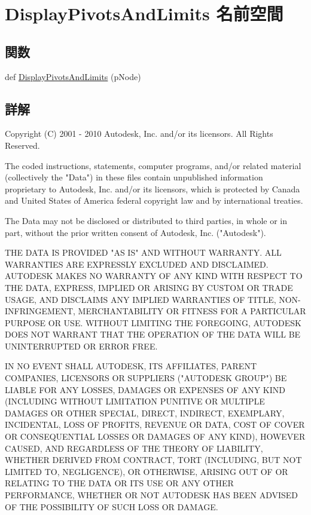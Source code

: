 \hypertarget{namespace_display_pivots_and_limits}{}\section{Display\+Pivots\+And\+Limits 名前空間}
\label{namespace_display_pivots_and_limits}
\subsection*{関数}
\begin{DoxyCompactItemize}
\item 
def \hyperlink{namespace_display_pivots_and_limits_ae897a9edb3a2e347540c9ab058c697c8}{Display\+Pivots\+And\+Limits} (p\+Node)
\end{DoxyCompactItemize}


\subsection{詳解}
\begin{DoxyVerb} Copyright (C) 2001 - 2010 Autodesk, Inc. and/or its licensors.
 All Rights Reserved.

 The coded instructions, statements, computer programs, and/or related material 
 (collectively the "Data") in these files contain unpublished information 
 proprietary to Autodesk, Inc. and/or its licensors, which is protected by 
 Canada and United States of America federal copyright law and by international 
 treaties. 
 
 The Data may not be disclosed or distributed to third parties, in whole or in
 part, without the prior written consent of Autodesk, Inc. ("Autodesk").

 THE DATA IS PROVIDED "AS IS" AND WITHOUT WARRANTY.
 ALL WARRANTIES ARE EXPRESSLY EXCLUDED AND DISCLAIMED. AUTODESK MAKES NO
 WARRANTY OF ANY KIND WITH RESPECT TO THE DATA, EXPRESS, IMPLIED OR ARISING
 BY CUSTOM OR TRADE USAGE, AND DISCLAIMS ANY IMPLIED WARRANTIES OF TITLE, 
 NON-INFRINGEMENT, MERCHANTABILITY OR FITNESS FOR A PARTICULAR PURPOSE OR USE. 
 WITHOUT LIMITING THE FOREGOING, AUTODESK DOES NOT WARRANT THAT THE OPERATION
 OF THE DATA WILL BE UNINTERRUPTED OR ERROR FREE. 
 
 IN NO EVENT SHALL AUTODESK, ITS AFFILIATES, PARENT COMPANIES, LICENSORS
 OR SUPPLIERS ("AUTODESK GROUP") BE LIABLE FOR ANY LOSSES, DAMAGES OR EXPENSES
 OF ANY KIND (INCLUDING WITHOUT LIMITATION PUNITIVE OR MULTIPLE DAMAGES OR OTHER
 SPECIAL, DIRECT, INDIRECT, EXEMPLARY, INCIDENTAL, LOSS OF PROFITS, REVENUE
 OR DATA, COST OF COVER OR CONSEQUENTIAL LOSSES OR DAMAGES OF ANY KIND),
 HOWEVER CAUSED, AND REGARDLESS OF THE THEORY OF LIABILITY, WHETHER DERIVED
 FROM CONTRACT, TORT (INCLUDING, BUT NOT LIMITED TO, NEGLIGENCE), OR OTHERWISE,
 ARISING OUT OF OR RELATING TO THE DATA OR ITS USE OR ANY OTHER PERFORMANCE,
 WHETHER OR NOT AUTODESK HAS BEEN ADVISED OF THE POSSIBILITY OF SUCH LOSS
 OR DAMAGE. \end{DoxyVerb}
 

